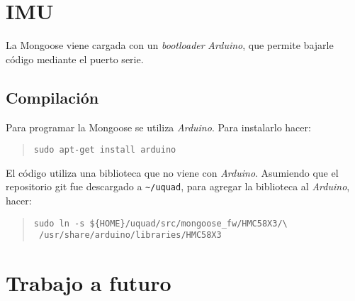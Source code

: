 \documentclass[main]{subfiles}
\begin{document}
\section{IMU}
\label{sec:codigo:imu}

La Mongoose viene cargada con un \textit{bootloader} \textit{Arduino}, que permite bajarle código mediante el puerto serie.\\

\subsection{Compilación}
\label{sec:codigo:compilacion-mongoose}

Para programar la Mongoose se utiliza \textit{Arduino}. Para instalarlo hacer:
\begin{quote}
\begin{verbatim}
sudo apt-get install arduino
\end{verbatim}
\end{quote}

El código utiliza una biblioteca que no viene con \textit{Arduino}. Asumiendo que el repositorio git fue descargado a \verb+~/uquad+, para agregar la biblioteca al \textit{Arduino}, hacer:
\begin{quote}
\begin{verbatim}
sudo ln -s ${HOME}/uquad/src/mongoose_fw/HMC58X3/\
 /usr/share/arduino/libraries/HMC58X3
\end{verbatim}
\end{quote}

\section{Trabajo a futuro}
\label{sec:codigo:trabajo-a-futuro}
\end{document}
